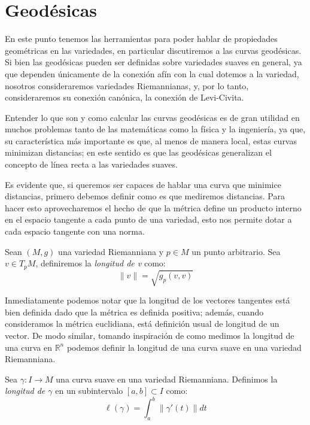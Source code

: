\section{Geodésicas}\label{Sección: Geodésicas}
En este punto tenemos las herramientas para poder hablar de propiedades geométricas en las variedades, en particular discutiremos a las curvas geodésicas. Si bien las geodésicas pueden ser definidas sobre variedades suaves en general, ya que dependen únicamente de la conexión afín con la cual dotemos a la variedad, nosotros consideraremos variedades Riemannianas, y, por lo tanto, consideraremos su conexión canónica, la conexión de Levi-Civita.

Entender lo que son y como calcular las curvas geodésicas es de gran utilidad en muchos problemas tanto de las matemáticas como la física y la ingeniería, ya que, su característica más importante es que, al menos de manera local, estas curvas minimizan distancias; en este sentido es que las geodésicas generalizan el concepto de línea recta a las variedades suaves.

Es evidente que, si queremos ser capaces de hablar una curva que minimice distancias, primero debemos definir como es que mediremos distancias. Para hacer esto aprovecharemos el hecho de que la métrica define un producto interno en el espacio tangente a cada punto de una variedad, esto nos permite dotar a cada espacio tangente con una norma.

\begin{definition}
Sean $(M,g)$ una variedad Riemanniana y $p \in M$ un punto arbitrario. Sea $v \in T_{p}M$, definiremos la \textit{longitud de v} como:
\[
	\|v\| = \sqrt{g_{p}(v,v)}
\]
\end{definition}
Inmediatamente podemos notar que la longitud de los vectores tangentes está bien definida dado que la métrica es definida positiva; además, cuando consideramos la métrica euclidiana, está definición usual de longitud de un vector. De modo similar, tomando inspiración de como medimos la longitud de una curva en $\mathbb{R}^{n}$ podemos definir la longitud de una curva suave en una variedad Riemanniana.
\begin{definition}
	Sea $\gamma: I \to M$ una curva suave en una variedad Riemanniana. Definimos la \textit{longitud de $\gamma$} en un subintervalo $[a,b] \subset I$ como:
	\[
		\ell(\gamma) = \int_{a}^{b} \|\gamma'(t)\| dt
	\]
\end{definition}

